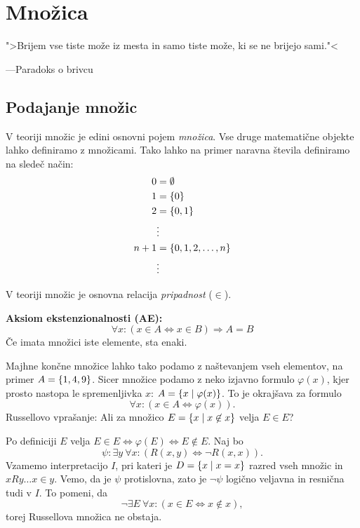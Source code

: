 \documentclass[12pt, a4paper]{article}
\renewcommand{\implies}{\Rightarrow}
\renewcommand{\iff}{\Leftrightarrow}
\begin{document}
\newpage

\section{Množica}

\epigraph{">Brijem vse tiste može iz mesta in samo tiste može, ki se ne brijejo sami."<}{---Paradoks o brivcu}

\subsection{Podajanje množic}

V teoriji množic je edini osnovni pojem \emph{množica}. Vse druge matematične objekte lahko definiramo z množicami. Tako lahko na primer naravna števila definiramo na sledeč način:
\begin{align*}
0&=\emptyset
\\
1&=\left\{0\right\}
\\
2&=\left\{0,1\right\}
\\
&\vdots
\\
n+1&=\left\{0,1,2,\dots,n\right\}
\\
&\vdots
\end{align*}

V teoriji množic je osnovna relacija \emph{pripadnost} ($\in$).

\begin{okvir}
\textbf{Aksiom ekstenzionalnosti (AE):}
\[
\forall x\colon(x\in A\iff x\in B)\implies A=B
\]
Če imata množici iste elemente, sta enaki.
\end{okvir}

Majhne končne množice lahko tako podamo z naštevanjem vseh elementov, na primer $A=\left\{1,4,9\right\}$. Sicer množice podamo z neko izjavno formulo $\varphi(x)$, kjer prosto nastopa le spremenljivka $x$: $A=\left\{x\mid\varphi(x)\right\}$. To je okrajšava za formulo
\[
\forall x\colon(x\in A\iff\varphi(x)).
\]
Russellovo vprašanje: Ali za množico $E=\left\{x\mid x\not\in x\right\}$ velja $E\in E$?

Po definiciji $E$ velja $E\in E\iff\varphi(E)\iff E\not\in E$. Naj bo
\[
\psi\colon\exists y~\forall x\colon(R(x,y)\iff\neg R(x,x)).
\]
Vzamemo interpretacijo $I$, pri kateri je $D=\left\{x\mid x=x\right\}$ razred vseh množic in $xRy\dots x\in y$. Vemo, da je $\psi$ protislovna, zato je $\neg\psi$ logično veljavna in resnična tudi v $I$. To pomeni, da
\[
\neg\exists E~\forall x\colon(x\in E\iff x\not\in x),
\]
torej Russellova množica ne obstaja.
\end{document}
